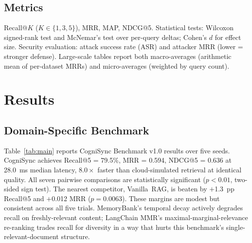 \documentclass[sigconf,authordraft]{acmart}
\begin{document}
\subsection{Metrics}

Recall@$K$ ($K \in \{1,3,5\}$), MRR, MAP, NDCG@5. Statistical tests:
Wilcoxon signed-rank test and McNemar's test over per-query deltas;
Cohen's $d$ for effect size. Security evaluation: attack success rate
(ASR) and attacker MRR (lower = stronger defense). Large-scale tables
report both macro-averages (arithmetic mean of per-dataset MRRs) and
micro-averages (weighted by query count).

\section{Results}

\subsection{Domain-Specific Benchmark}
\label{sec:domain}

Table~\ref{tab:main} reports CogniSync Benchmark v1.0 results over five
seeds. CogniSync achieves Recall@5 = 79.5\%, MRR = 0.594, NDCG@5 =
0.636 at 28.0~ms median latency, $8.0\times$ faster than cloud-simulated
retrieval at identical quality. All seven pairwise comparisons are
statistically significant ($p < 0.01$, two-sided sign test). The nearest
competitor, Vanilla~RAG, is beaten by $+$1.3~pp Recall@5 and $+$0.012
MRR ($p = 0.0063$). These margins are modest but consistent across all
five trials. MemoryBank's temporal decay actively degrades recall on
freshly-relevant content; LangChain MMR's maximal-marginal-relevance
re-ranking trades recall for diversity in a way that hurts this
benchmark's single-relevant-document structure.
\end{document}
